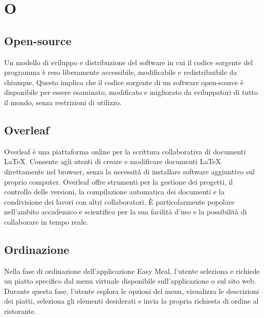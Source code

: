\section*{O} 
\subsection*{Open-source} 
Un modello di sviluppo e distribuzione del software in cui il codice sorgente del programma è reso liberamente accessibile, modificabile e redistribuibile da chiunque. Questo implica che il codice sorgente di un software open-source è disponibile per essere esaminato, modificato e migliorato da sviluppatori di tutto il mondo, senza restrizioni di utilizzo.
\subsection*{Overleaf} 
Overleaf è una piattaforma online per la scrittura collaborativa di documenti LaTeX. Consente agli utenti di creare e modificare documenti LaTeX direttamente nel browser, senza la necessità di installare software aggiuntivo sul proprio computer. Overleaf offre strumenti per la gestione dei progetti, il controllo delle versioni, la compilazione automatica dei documenti e la condivisione dei lavori con altri collaboratori. È particolarmente popolare nell'ambito accademico e scientifico per la sua facilità d'uso e la possibilità di collaborare in tempo reale. 
\subsection*{Ordinazione} 
Nella fase di ordinazione dell'applicazione Easy Meal, l'utente seleziona e richiede un piatto specifico dal menu virtuale disponibile sull'applicazione o sul sito web. Durante questa fase, l'utente esplora le opzioni del menu, visualizza le descrizioni dei piatti, seleziona gli elementi desiderati e invia la propria richiesta di ordine al ristorante. 
